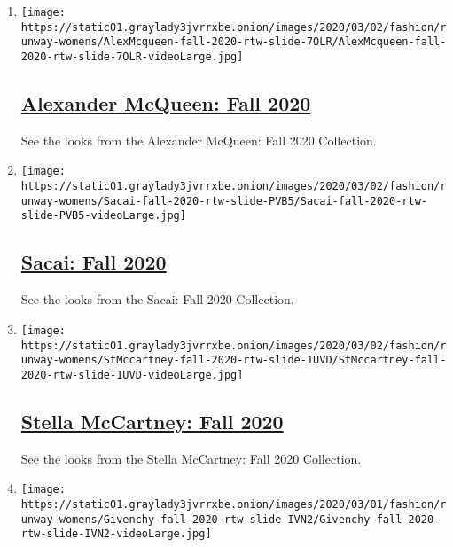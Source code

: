 \begin{enumerate}
\def\labelenumi{\arabic{enumi}.}
\item
  \texttt{[image: https://static01.graylady3jvrrxbe.onion/images/2020/03/02/fashion/runway-womens/AlexMcqueen-fall-2020-rtw-slide-7OLR/AlexMcqueen-fall-2020-rtw-slide-7OLR-videoLarge.jpg]}

  \hypertarget{alexander-mcqueen-fall-2020}{%
  \subsection{\texorpdfstring{\href{/slideshow/2020/03/02/fashion/runway-womens/alexander-mcqueen-fall-2020.html}{Alexander
  McQueen: Fall
  2020}}{Alexander McQueen: Fall 2020}}\label{alexander-mcqueen-fall-2020}}

  See the looks from the Alexander McQueen: Fall 2020 Collection.
\item
  \texttt{[image: https://static01.graylady3jvrrxbe.onion/images/2020/03/02/fashion/runway-womens/Sacai-fall-2020-rtw-slide-PVB5/Sacai-fall-2020-rtw-slide-PVB5-videoLarge.jpg]}

  \hypertarget{sacai-fall-2020}{%
  \subsection{\texorpdfstring{\href{/slideshow/2020/03/02/fashion/runway-womens/sacai-fall-2020.html}{Sacai:
  Fall 2020}}{Sacai: Fall 2020}}\label{sacai-fall-2020}}

  See the looks from the Sacai: Fall 2020 Collection.
\item
  \texttt{[image: https://static01.graylady3jvrrxbe.onion/images/2020/03/02/fashion/runway-womens/StMccartney-fall-2020-rtw-slide-1UVD/StMccartney-fall-2020-rtw-slide-1UVD-videoLarge.jpg]}

  \hypertarget{stella-mccartney-fall-2020}{%
  \subsection{\texorpdfstring{\href{/slideshow/2020/03/02/fashion/runway-womens/stella-mccartney-fall-2020.html}{Stella
  McCartney: Fall
  2020}}{Stella McCartney: Fall 2020}}\label{stella-mccartney-fall-2020}}

  See the looks from the Stella McCartney: Fall 2020 Collection.
\item
  \texttt{[image: https://static01.graylady3jvrrxbe.onion/images/2020/03/01/fashion/runway-womens/Givenchy-fall-2020-rtw-slide-IVN2/Givenchy-fall-2020-rtw-slide-IVN2-videoLarge.jpg]}


\end{enumerate}
